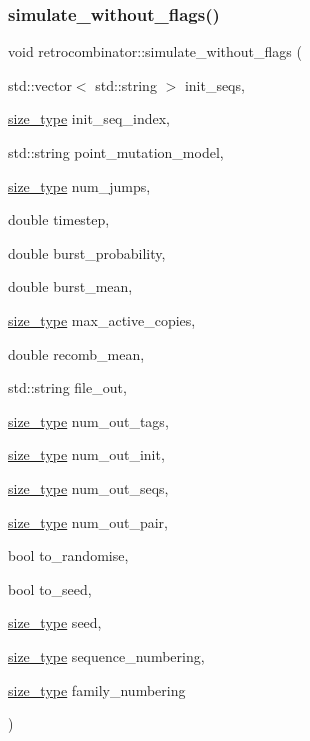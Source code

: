 \subsubsection{\texorpdfstring{simulate\+\_\+without\+\_\+flags()}{simulate\_without\_flags()}\hspace{0.1cm}{\footnotesize\ttfamily [1/2]}}
{\footnotesize\ttfamily void retrocombinator\+::simulate\+\_\+without\+\_\+flags (\begin{DoxyParamCaption}\item[{std\+::vector$<$ std\+::string $>$}]{init\+\_\+seqs,  }\item[{\hyperlink{namespaceretrocombinator_a8e1541b50cee66a791df4c437ccbb385}{size\+\_\+type}}]{init\+\_\+seq\+\_\+index,  }\item[{std\+::string}]{point\+\_\+mutation\+\_\+model,  }\item[{\hyperlink{namespaceretrocombinator_a8e1541b50cee66a791df4c437ccbb385}{size\+\_\+type}}]{num\+\_\+jumps,  }\item[{double}]{timestep,  }\item[{double}]{burst\+\_\+probability,  }\item[{double}]{burst\+\_\+mean,  }\item[{\hyperlink{namespaceretrocombinator_a8e1541b50cee66a791df4c437ccbb385}{size\+\_\+type}}]{max\+\_\+active\+\_\+copies,  }\item[{double}]{recomb\+\_\+mean,  }\item[{std\+::string}]{file\+\_\+out,  }\item[{\hyperlink{namespaceretrocombinator_a8e1541b50cee66a791df4c437ccbb385}{size\+\_\+type}}]{num\+\_\+out\+\_\+tags,  }\item[{\hyperlink{namespaceretrocombinator_a8e1541b50cee66a791df4c437ccbb385}{size\+\_\+type}}]{num\+\_\+out\+\_\+init,  }\item[{\hyperlink{namespaceretrocombinator_a8e1541b50cee66a791df4c437ccbb385}{size\+\_\+type}}]{num\+\_\+out\+\_\+seqs,  }\item[{\hyperlink{namespaceretrocombinator_a8e1541b50cee66a791df4c437ccbb385}{size\+\_\+type}}]{num\+\_\+out\+\_\+pair,  }\item[{bool}]{to\+\_\+randomise,  }\item[{bool}]{to\+\_\+seed,  }\item[{\hyperlink{namespaceretrocombinator_a8e1541b50cee66a791df4c437ccbb385}{size\+\_\+type}}]{seed,  }\item[{\hyperlink{namespaceretrocombinator_a8e1541b50cee66a791df4c437ccbb385}{size\+\_\+type}}]{sequence\+\_\+numbering,  }\item[{\hyperlink{namespaceretrocombinator_a8e1541b50cee66a791df4c437ccbb385}{size\+\_\+type}}]{family\+\_\+numbering }\end{DoxyParamCaption})}



